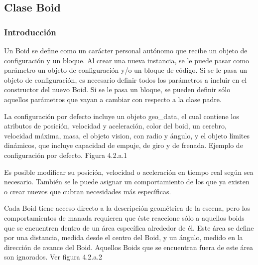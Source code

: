 \subsection{Clase Boid}
\label{subsection:boid}

\subsubsection{Introducción}
\label{subsubsection:boid_general}

Un Boid se define como un carácter personal autónomo que recibe un objeto de configuración y un bloque. Al crear una nueva instancia, se 
le puede pasar como parámetro un objeto de configuración y/o un bloque de código. Si se le pasa un objeto de configuración, es necesario 
definir todos los parámetros a incluir en el constructor del nuevo Boid. Si se le pasa un bloque, se pueden definir sólo aquellos parámetros 
que vayan a cambiar con respecto a la clase padre.

La configuración por defecto incluye un objeto geo\_data, el cual contiene los atributos de posición, velocidad y aceleración, color del 
boid, un cerebro, velocidad máxima, masa, el objeto vision, con radio y ángulo, y el objeto límites dinámicos, que incluye capacidad de 
empuje, de giro y de frenada. Ejemplo de configuración por defecto. Figura 4.2.a.1

Es posible modificar su posición, velocidad o aceleración en tiempo real según sea necesario. También se le puede asignar un comportamiento 
de los que ya existen o crear nuevos que cubran necesidades más específicas.

Cada Boid tiene acceso directo a la descripción geométrica de la escena, pero los comportamientos de manada requieren que éste reaccione 
sólo a aquellos boids que se encuentren dentro de un área específica alrededor de él. Este área se define por una distancia, medida desde 
el centro del Boid, y un ángulo, medido en la dirección de avance del Boid. Aquellos Boids que se encuentran fuera de este área son ignorados. Ver figura 4.2.a.2\newline


